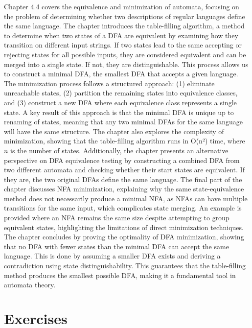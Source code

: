 \documentclass{article}
\theoremstyle{theorem}
\theoremstyle{definition}
\theoremstyle{remark}
\begin{document}
Chapter 4.4 covers the equivalence and minimization of automata, focusing on the problem of determining whether two descriptions of regular languages define the same language. The chapter introduces the table-filling algorithm, a method to determine when two states of a DFA are equivalent by examining how they transition on different input strings. If two states lead to the same accepting or rejecting states for all possible inputs, they are considered equivalent and can be merged into a single state. If not, they are distinguishable. This process allows us to construct a minimal DFA, the smallest DFA that accepts a given language. The minimization process follows a structured approach: (1) eliminate unreachable states, (2) partition the remaining states into equivalence classes, and (3) construct a new DFA where each equivalence class represents a single state. A key result of this approach is that the minimal DFA is unique up to renaming of states, meaning that any two minimal DFAs for the same language will have the same structure. The chapter also explores the complexity of minimization, showing that the table-filling algorithm runs in O(n²) time, where \( n \) is the number of states. Additionally, the chapter presents an alternative perspective on DFA equivalence testing by constructing a combined DFA from two different automata and checking whether their start states are equivalent. If they are, the two original DFAs define the same language. The final part of the chapter discusses NFA minimization, explaining why the same state-equivalence method does not necessarily produce a minimal NFA, as NFAs can have multiple transitions for the same input, which complicates state merging. An example is provided where an NFA remains the same size despite attempting to group equivalent states, highlighting the limitations of direct minimization techniques. The chapter concludes by proving the optimality of DFA minimization, showing that no DFA with fewer states than the minimal DFA can accept the same language. This is done by assuming a smaller DFA exists and deriving a contradiction using state distinguishability. This guarantees that the table-filling method produces the smallest possible DFA, making it a fundamental tool in automata theory.

\newpage
\section{Exercises}\label{sec:exercises}
\end{document}
